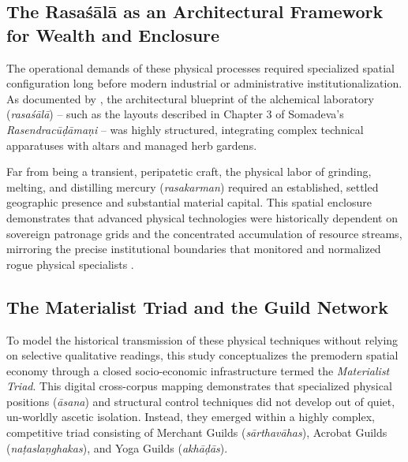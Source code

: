 \documentclass[11pt,twoside,letterpaper]{article}
\begin{document}
\subsection{The Rasaśālā as an Architectural Framework for Wealth and Enclosure}
The operational demands of these physical processes required specialized spatial configuration long before modern industrial or administrative institutionalization. As documented by \citet{Wujastyk2025}, the architectural blueprint of the alchemical laboratory (\textit{rasaśālā}) -- such as the layouts described in Chapter 3 of Somadeva’s \textit{Rasendracūḍāmaṇi} -- was highly structured, integrating complex technical apparatuses with altars and managed herb gardens.

Far from being a transient, peripatetic craft, the physical labor of grinding, melting, and distilling mercury (\textit{rasakarman}) required an established, settled geographic presence and substantial material capital. This spatial enclosure demonstrates that advanced physical technologies were historically dependent on sovereign patronage grids and the concentrated accumulation of resource streams, mirroring the precise institutional boundaries that monitored and normalized rogue physical specialists \citep{Wujastyk2025}.
\label{sec:somatic_capital_frontier_economics}

\subsection{The Materialist Triad and the Guild Network}

To model the historical transmission of these physical techniques without relying on selective qualitative readings, this study conceptualizes the premodern spatial economy through a closed socio-economic infrastructure termed the \textit{Materialist Triad}. This digital cross-corpus mapping demonstrates that specialized physical positions (\textit{āsana}) and structural control techniques did not develop out of quiet, un-worldly ascetic isolation. Instead, they emerged within a highly complex, competitive triad consisting of Merchant Guilds (\textit{sārthavāhas}), Acrobat Guilds (\textit{naṭas}\text{/}\textit{laṇghakas}), and Yoga Guilds (\textit{akhāḍās}).
\end{document}
